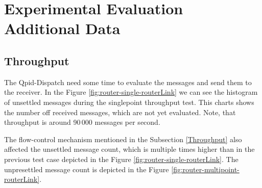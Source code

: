 \chapter{Experimental Evaluation Additional Data}
\label{Experimental Evaluation Additional Data}

\section*{Throughput}
The Qpid-Dispatch need some time to evaluate the messages and send them to the receiver. In the Figure \ref{fig:router-single-routerLink} we can see the histogram of unsettled messages during the singlepoint throughput test. This charts shows the number off received messages, which are not yet evaluated. Note, that throughput is around 90\,000 messages per second.

The flow-control mechanism mentioned in the Subsection \ref{Throughput} also affected the unsettled message count, which is multiple times higher than in the previous test case depicted in the Figure \ref{fig:router-single-routerLink}. The unpresettled message count is depicted in the Figure \ref{fig:router-multipoint-routerLink}.

